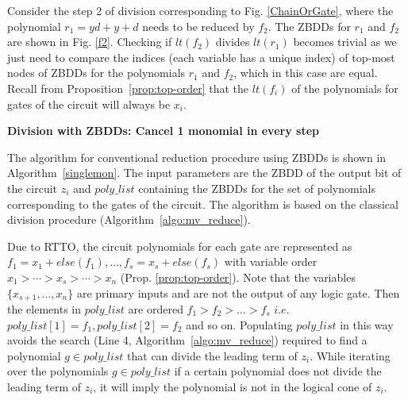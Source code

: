 Consider  the step 2 of division corresponding to Fig. \ref{ChainOrGate}, where the
polynomial $r_1 = yd +y+d$ needs to be reduced by $f_2$. The ZBDDs for
$r_1$ and $f_2$ are shown in Fig. \ref{f2}. 
Checking if $lt(f_2)$ divides $lt(r_1)$ becomes trivial as we just
need to compare the indices (each variable has a unique index) of top-most nodes of ZBDDs 
for the polynomials $r_1$ and $f_2$, which in this case are equal.
Recall from Proposition~\ref{prop:top-order} that the $lt(f_i)$ of the polynomials for gates of the circuit will always be $x_i$. 


{\bf Division with ZBDDs: Cancel 1 monomial in every step}

The algorithm for conventional reduction procedure using ZBDDs is
shown in Algorithm~\ref{singlemon}. The input parameters are the ZBDD of the output bit 
of the circuit $z_i$ and $poly\_list$ containing the ZBDDs for 
the set of polynomials corresponding to the gates of the circuit. 
The algorithm is based on the classical division procedure (Algorithm~\ref{algo:mv_reduce}).



 Due to RTTO, the circuit polynomials for each gate are represented as $f_1= x_1 +
 else(f_1), \dots, f_s= x_s + else(f_s)$ with variable order 
 $x_1 > \cdots > x_s > \cdots > x_n$ (Prop. \ref{prop:top-order}). Note that the variables $\{x_{s+1}, \dots , x_{n}\}$ are 
 primary inputs and are not the output of any logic gate.  Then the elements
in $poly\_list$ are ordered $f_1 > f_2 > \dots > f_s$ $i.e.$ $poly\_list[1] = f_1, poly\_list[2] = f_2$ and so on. 
 Populating $poly\_list$ in this way avoids the search (Line 4, Algorithm~\ref{algo:mv_reduce}) required
 to find a polynomial $g \in poly\_list$ that can divide the leading
 term of $z_i$. While iterating over the polynomials $g \in poly\_list$
 if a certain polynomial does not divide the leading term of $z_i$, it
 will imply the polynomial is not in the logical cone of $z_i$.   

